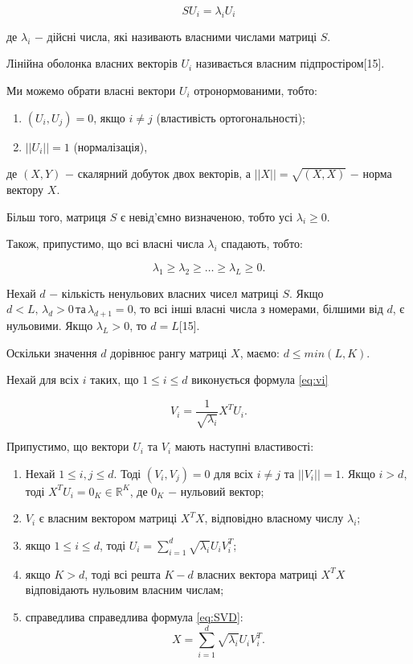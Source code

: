 \[
SU_{i} = \lambda_{i}U_{i}
\]

\noindent де $\lambda_{i}$ $-$ дійсні числа, які називають власними числами матриці $S$. 

Лінійна оболонка власних векторів $U_{i}$ називається власним підпростіром[15].

Ми можемо обрати власні вектори $U_{i}$ отронормованими, тобто:

\begin{enumerate}
	\item $(U_{i}, U_{j}) = 0$, якщо $i \ne j$ (властивість ортогональності);
	\item $||U_{i}|| = 1$ (нормалізація),
\end{enumerate}

\noindent де $(X, Y)$ $-$ скалярний добуток двох векторів, а $||X|| = \sqrt{(X,X)}$ $-$ норма вектору $X$.

Більш того, матриця $S$ є невід'ємно визначеною, тобто усі $\lambda_{i} \ge 0$.

Також, припустимо, що всі власні числа $\lambda_{i}$ спадають, тобто: 

\[
\lambda_{1} \ge \lambda_{2} \ge \dots \ge \lambda_{L} \ge 0.
\]

Нехай $d$ $-$ кількість ненульових власних чисел матриці $S$. Якщо $d < L, \, \lambda_{d} > 0 \, \text{та} \, \lambda_{d+1} = 0$, то всі інші власні числа з номерами, білшими від $d$, є нульовими. Якщо $\lambda_{L} > 0$, то $d = L$[15]. 

Оскільки значення $d$ дорівнює рангу матриці $X$, маємо: $d \le min(L, K)$.

Нехай для всіх $i$ таких, що $1 \le i \le d$ виконується формула \ref{eq:vi}

\begin{equation}\label{eq:vi}
V_{i} = \frac{1}{\sqrt{\lambda_{i}}}X^{T}U_{i}.
\end{equation}

Припустимо, що вектори $U_{i}$ та $V_{i}$ мають наступні властивості:

\begin{enumerate}
	\item Нехай $1 \le i, j \le d$. Тоді $(V_{i}, V_{j}) = 0$ для всіх $i \ne j$ та $||V_{i}|| = 1$. Якщо $i > d$, тоді $X^{T}U_{i}=0_{K} \in \mathds{R}^{K}$, де $0_{K}$ $-$ нульовий вектор;
	\item $V_{i}$ є власним вектором матриці $X^{T}X$, відповідно власному числу $\lambda_{i}$;
	\item якщо $1 \le i \le d$, тоді $U_{i} = \sum^d_{i=1}\sqrt{\lambda_{i}}U_{i}V_{i}^{T}$;
	\item якщо $K > d$, тоді всі решта $K - d$ власних вектора матриці $X^{T}X$ відповідають нульовим власним числам;
	\item справедлива справедлива формула \ref{eq:SVD}:
	\begin{equation}\label{eq:SVD}
	X = \sum_{i=1}^{d}\sqrt{\lambda_{i}}U_{i}V_{i}^{T}.
	\end{equation}
\end{enumerate}

